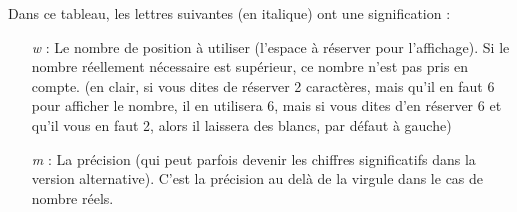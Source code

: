 \documentclass[a4paper,twoside]{article}
\begin{document}
Dans ce tableau, les lettres suivantes (en italique) ont une signification :
\begin{itemize}
\item[\emph{w}]: Le nombre de position à utiliser (l'espace à réserver pour l'affichage). Si le nombre réellement nécessaire est supérieur, ce nombre n'est pas pris en compte. (en clair, si vous dites de réserver 2 caractères, mais qu'il en faut 6 pour afficher le nombre, il en utilisera 6, mais si vous dites d'en réserver 6 et qu'il vous en faut 2, alors il laissera des blancs, par défaut à gauche)
\item[\emph{m}]: La précision (qui peut parfois devenir les chiffres significatifs dans la version alternative). C'est la précision au delà de la virgule dans le cas de nombre réels.
\end{itemize}
\end{document}
